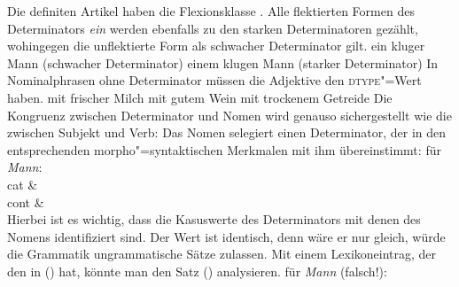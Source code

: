 Die definiten Artikel haben die Flexionsklasse . Alle flektierten Formen
des Determinators \emph{ein} werden ebenfalls zu den starken Determinatoren gezählt,
wohingegen die unflektierte Form als schwacher Determinator gilt.
\eal
\ex ein kluger Mann   (schwacher Determinator)
\ex einem klugen Mann (starker Determinator)
\zl
In Nominalphrasen ohne Determinator müssen die Adjektive den \textsc{dtype}"=Wert  haben.
\eal
\ex mit frischer Milch
\ex mit gutem Wein
\ex mit trockenem Getreide
\zl
Die Kongruenz zwischen Determinator und Nomen wird genauso sichergestellt wie die zwischen Subjekt und Verb:
Das Nomen selegiert einen Determinator, der in den entsprechenden morpho"=syntaktischen Merkmalen
mit ihm übereinstimmt:
\ea
\label{le-mann}
\localw für \emph{Mann}:\\
\ms
{ cat &  \\
  cont &  \\
}
\z
Hierbei ist es wichtig, dass die Kasuswerte des Determinators mit denen des Nomens
identifiziert sind. Der Wert ist identisch, denn wäre er nur gleich, würde die Grammatik
ungrammatische Sätze zulassen. Mit einem Lexikoneintrag, der den \catw in () hat,
könnte man den Satz () analysieren.
\ea
\catw für \emph{Mann} (falsch!):\\
